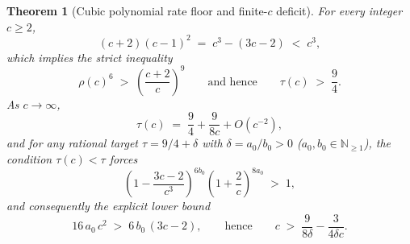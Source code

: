 \documentclass[11pt,a4paper]{article}
\theoremstyle{plain}
\newtheorem{theorem}{Theorem}[section]
\theoremstyle{definition}
\theoremstyle{remark}
\newcommand{\N}{\mathbb{N}}
\begin{document}
\begin{theorem}[Cubic polynomial rate floor and finite-$c$ deficit]
\label{thm:cubic_rate_floor}
For every integer $c \ge 2$,
\begin{equation}
    (c + 2)(c - 1)^2 \;=\; c^3 - (3c - 2) \;<\; c^3 ,
    \label{eq:cubic_identity}
\end{equation}
which implies the strict inequality
\begin{equation}
    \rho(c)^6 \;>\; \left(\frac{c + 2}{c}\right)^9 \qquad\text{and hence}\qquad \tau(c) \;>\; \frac{9}{4} .
    \label{eq:tau_strict_gt_94}
\end{equation}
As $c \to \infty$,
\begin{equation}
    \tau(c) \;=\; \frac{9}{4} + \frac{9}{8c} + O(c^{-2}) ,
    \label{eq:tau_laurent}
\end{equation}
and for any rational target $\tau = 9/4 + \delta$ with $\delta = a_0/b_0 > 0$ ($a_0, b_0 \in \N_{\ge 1}$), the condition $\tau(c) < \tau$ forces
\begin{equation}
    \left(1 - \frac{3c - 2}{c^3}\right)^{6 b_0}\left(1 + \frac{2}{c}\right)^{8 a_0} \;>\; 1 ,
    \label{eq:c_min_exact_poly}
\end{equation}
and consequently the explicit lower bound
\begin{equation}
    16\,a_0\,c^2 \;>\; 6\,b_0\,(3c - 2), \qquad\text{hence}\qquad c \;>\; \frac{9}{8\delta} - \frac{3}{4\delta c} .
    \label{eq:c_min_bound}
\end{equation}
\end{theorem}
\end{document}
